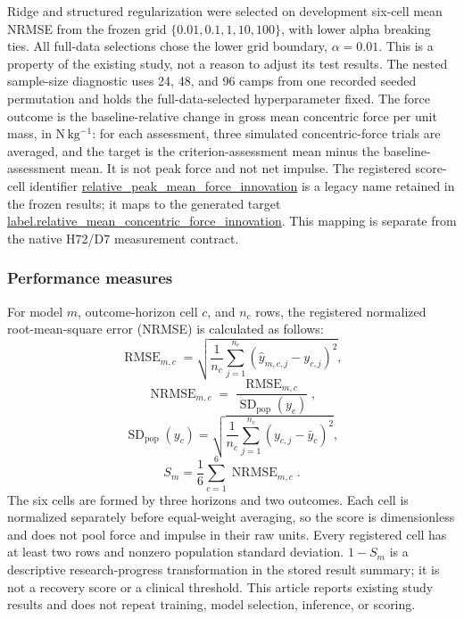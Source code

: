 \documentclass[12pt,a4paper]{article}
\newcommand{\NRMSE}{\operatorname{NRMSE}}
\newcommand{\RMSE}{\operatorname{RMSE}}
\newcommand{\ident}[1]{{\urlstyle{tt}\url{#1}}}
\begin{document}
Ridge and structured regularization were selected on development six-cell mean NRMSE from the frozen grid \(\{0.01,0.1,1,10,100\}\), with lower alpha breaking ties. All full-data selections chose the lower grid boundary, \(\alpha=0.01\). This is a property of the existing study, not a reason to adjust its test results. The nested sample-size diagnostic uses 24, 48, and 96 camps from one recorded seeded permutation and holds the full-data-selected hyperparameter fixed. The force outcome is the baseline-relative change in gross mean concentric force per unit mass, in \(\mathrm{N\,kg^{-1}}\): for each assessment, three simulated concentric-force trials are averaged, and the target is the criterion-assessment mean minus the baseline-assessment mean. It is not peak force and not net impulse. The registered score-cell identifier \ident{relative_peak_mean_force_innovation} is a legacy name retained in the frozen results; it maps to the generated target \ident{label.relative_mean_concentric_force_innovation}. This mapping is separate from the native H72/D7 measurement contract.

\subsubsection{Performance measures}

For model \(m\), outcome-horizon cell \(c\), and \(n_c\) rows, the registered normalized root-mean-square error (NRMSE) is calculated as follows:
\begin{equation}
\RMSE_{m,c} = \sqrt{\frac{1}{n_c}\sum_{j=1}^{n_c}(\hat{y}_{m,c,j}-y_{c,j})^2},
\label{eq:rmse}
\end{equation}
\begin{equation}
\NRMSE_{m,c} = \frac{\RMSE_{m,c}}{\operatorname{SD}_{\mathrm{pop}}(y_c)},
\label{eq:nrmse}
\end{equation}
\begin{equation}
\operatorname{SD}_{\mathrm{pop}}(y_c)=\sqrt{\frac{1}{n_c}\sum_{j=1}^{n_c}(y_{c,j}-\bar{y}_c)^2},
\label{eq:sd_pop}
\end{equation}
\begin{equation}
S_m = \frac{1}{6}\sum_{c=1}^{6}\NRMSE_{m,c}.
\label{eq:six_cell_score}
\end{equation}
The six cells are formed by three horizons and two outcomes. Each cell is normalized separately before equal-weight averaging, so the score is dimensionless and does not pool force and impulse in their raw units. Every registered cell has at least two rows and nonzero population standard deviation. \(1-S_m\) is a descriptive research-progress transformation in the stored result summary; it is not a recovery score or a clinical threshold. This article reports existing study results and does not repeat training, model selection, inference, or scoring.
\end{document}
